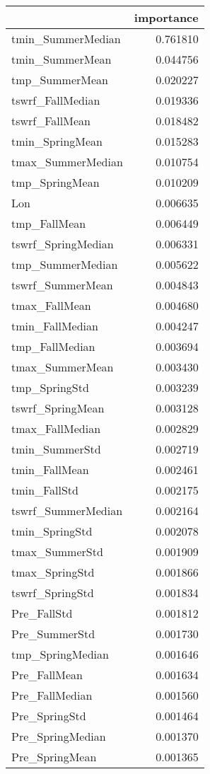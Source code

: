 \begin{tabular}{lr}
\toprule
 & importance \\
\midrule
tmin_SummerMedian & 0.761810 \\
tmin_SummerMean & 0.044756 \\
tmp_SummerMean & 0.020227 \\
tswrf_FallMedian & 0.019336 \\
tswrf_FallMean & 0.018482 \\
tmin_SpringMean & 0.015283 \\
tmax_SummerMedian & 0.010754 \\
tmp_SpringMean & 0.010209 \\
Lon & 0.006635 \\
tmp_FallMean & 0.006449 \\
tswrf_SpringMedian & 0.006331 \\
tmp_SummerMedian & 0.005622 \\
tswrf_SummerMean & 0.004843 \\
tmax_FallMean & 0.004680 \\
tmin_FallMedian & 0.004247 \\
tmp_FallMedian & 0.003694 \\
tmax_SummerMean & 0.003430 \\
tmp_SpringStd & 0.003239 \\
tswrf_SpringMean & 0.003128 \\
tmax_FallMedian & 0.002829 \\
tmin_SummerStd & 0.002719 \\
tmin_FallMean & 0.002461 \\
tmin_FallStd & 0.002175 \\
tswrf_SummerMedian & 0.002164 \\
tmin_SpringStd & 0.002078 \\
tmax_SummerStd & 0.001909 \\
tmax_SpringStd & 0.001866 \\
tswrf_SpringStd & 0.001834 \\
Pre_FallStd & 0.001812 \\
Pre_SummerStd & 0.001730 \\
tmp_SpringMedian & 0.001646 \\
Pre_FallMean & 0.001634 \\
Pre_FallMedian & 0.001560 \\
Pre_SpringStd & 0.001464 \\
Pre_SpringMedian & 0.001370 \\
Pre_SpringMean & 0.001365 \\

\end{tabular}
